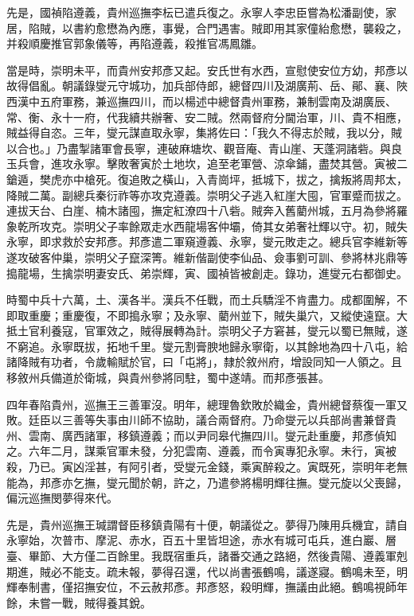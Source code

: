\begin{pinyinscope}
{{先是，國禎陷遵義，貴州巡撫李枟已遣兵復之。永寧人李忠臣嘗為松潘副使，家居，陷賊，以書約愈懋為內應，事覺，合門遇害。賊即用其家僮紿愈懋，襲殺之，并殺順慶推官郭象儀等，再陷遵義，殺推官馮鳳雛。

當是時，崇明未平，而貴州安邦彥又起。安氏世有水西，宣慰使安位方幼，邦彥以故得倡亂。朝議錄燮元守城功，加兵部侍郎，總督四川及湖廣荊、岳、鄖、襄、陜西漢中五府軍務，兼巡撫四川，而以楊述中總督貴州軍務，兼制雲南及湖廣辰、常、衡、永十一府，代我續共辦奢、安二賊。然兩督府分閫治軍，川、貴不相應，賊益得自恣。三年，燮元謀直取永寧，集將佐曰：「我久不得志於賊，我以分，賊以合也。」乃盡掣諸軍會長寧，連破麻塘坎、觀音庵、青山崖、天蓬洞諸砦。與良玉兵會，進攻永寧。擊敗奢寅於土地坎，追至老軍營、涼傘鋪，盡焚其營。寅被二鎗遁，樊虎亦中槍死。復追敗之橫山，入青崗坪，抵城下，拔之，擒叛將周邦太，降賊二萬。副總兵秦衍祚等亦攻克遵義。崇明父子逃入紅崖大囤，官軍蹙而拔之。連拔天台、白崖、楠木諸囤，撫定紅潦四十八砦。賊奔入舊藺州城，五月為參將羅象乾所攻克。崇明父子率餘眾走水西龍場客仲壩，倚其女弟奢社輝以守。初，賊失永寧，即求救於安邦彥。邦彥遣二軍窺遵義、永寧，燮元敗走之。總兵官李維新等遂攻破客仲巢，崇明父子竄深箐。維新偕副使李仙品、僉事劉可訓、參將林兆鼎等搗龍場，生擒崇明妻安氏、弟崇輝，寅、國禎皆被創走。錄功，進燮元右都御史。

時蜀中兵十六萬，土、漢各半。漢兵不任戰，而土兵驕淫不肯盡力。成都圍解，不即取重慶；重慶復，不即搗永寧；及永寧、藺州並下，賊失巢穴，又縱使遠竄。大抵土官利養寇，官軍效之，賊得展轉為計。崇明父子方窘甚，燮元以蜀已無賊，遂不窮追。永寧既拔，拓地千里。燮元割膏腴地歸永寧衛，以其餘地為四十八屯，給諸降賊有功者，令歲輸賦於官，曰「屯將」，隸於敘州府，增設同知一人領之。且移敘州兵備道於衛城，與貴州參將同駐，蜀中遂靖。而邦彥張甚。

四年春陷貴州，巡撫王三善軍沒。明年，總理魯欽敗於織金，貴州總督蔡復一軍又敗。廷臣以三善等失事由川師不協助，議合兩督府。乃命燮元以兵部尚書兼督貴州、雲南、廣西諸軍，移鎮遵義；而以尹同皋代撫四川。燮元赴重慶，邦彥偵知之。六年二月，謀乘官軍未發，分犯雲南、遵義，而令寅專犯永寧。未行，寅被殺，乃已。寅凶淫甚，有阿引者，受燮元金錢，乘寅醉殺之。寅既死，崇明年老無能為，邦彥亦乞撫，燮元聞於朝，許之，乃遣參將楊明輝往撫。燮元旋以父喪歸，偏沅巡撫閔夢得來代。

先是，貴州巡撫王瑊謂督臣移鎮貴陽有十便，朝議從之。夢得乃陳用兵機宜，請自永寧始，次普市、摩泥、赤水，百五十里皆坦途，赤水有城可屯兵，進白巖、層臺、畢節、大方僅二百餘里。我既宿重兵，諸番交通之路絕，然後貴陽、遵義軍剋期進，賊必不能支。疏未報，夢得召還，代以尚書張鶴鳴，議遂寢。鶴鳴未至，明輝奉制書，僅招撫安位，不云赦邦彥。邦彥怒，殺明輝，撫議由此絕。鶴鳴視師年餘，未嘗一戰，賊得養其銳。

}}
\end{pinyinscope}
